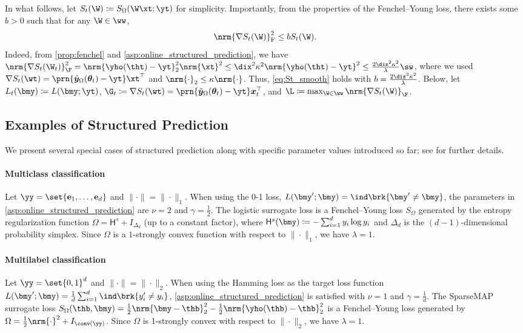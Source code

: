 In what follows, let $S_t(\W)\coloneqq S_\Omega(\W\xt;\yt)$ for simplicity.
Importantly, from the properties of the Fenchel--Young loss, there exists some $b>0$ such that for any $\W\in\ww$,  
\begin{equation}\label{eq:St_smooth}
    \nrm{\nabla S_t (\W)}_{\mathrm{F}}^2\leq b S_t(\W).
\end{equation}
Indeed, from \cref{prop:fenchel} and \cref{asp:online_structured_prediction}, we have 
$
\nrm{\nabla S_t(\W_t)}_\F^2
=
\nrm{\yho(\tht)-\yt}_2^2 \nrm{\xt}^2
\leq
\dix^2\kappa^2\nrm{\yho(\tht)-\yt}^2
\leq
\frac{2\dix^2\kappa^2}{\lambda}\sw
$, 
where we used $\nabla S_t(\wt) =  \prn{\hat{\bm{y}}_\Omega(\bm{\theta}_t) - \yt}\xt^\top$ and $\nrm{\cdot}_2 \leq \kappa \nrm{\cdot}$. 
Thus, \eqref{eq:St_smooth} holds with  $b=\frac{2\dix^2\kappa^2}{\lambda}$.
Below, let $L_t(\bmy)\coloneqq L(\bmy;\yt)$,
$\G_t\coloneqq\nabla S_t(\wt) =  \prn{\hat{\bm{y}}_\Omega(\bm{\theta}_t) - \yt} \bm{x}_t^\top$, and $\L\coloneqq\max_{\W\in\ww}\nrm{\nabla S_t(\W)}_\F$.


\subsection{Examples of Structured Prediction}\label{subsec:pre_examples} 
We present several special cases of structured prediction  
along with specific parameter values introduced so far; see \citet[Section 2.3]{pmlr-v247-sakaue24a} for further details.
\paragraph{Multiclass classification}
Let $\yy=\set{\mathbf{e}_1,\dots,\mathbf{e}_d}$ and $\|\cdot\| = \|\cdot\|_1$.
When using the 0-1 loss, $L(\bmy^{\prime};\bmy)=\ind\brk{\bmy^{\prime}\neq\bmy}$, the parameters in \cref{asp:online_structured_prediction} are $\nu=2$ and $\gamma=\frac{1}{2}$.
The logistic surrogate loss is a Fenchel--Young loss $S_\Omega$ generated by the entropy regularization function $\Omega=\mathsf{H}^s+I_{\Delta_d}$ (up to a constant factor), where $\mathsf{H}^s(\bmy)\coloneqq-\sum_{i=1}^d y_i\log y_i$ and $\Delta_d$ is the $(d-1)$-dimensional probability simplex.
Since $\Omega$ is a $1$-strongly convex function with respect to $\|\cdot\|_1$, we have $\lambda=1$.

\paragraph{Multilabel classification}
Let $\yy=\set{0,1}^d$ and $\|\cdot\| = \|\cdot\|_2$.
When using the Hamming loss as the target loss function $L(\bmy^{\prime};\bmy)=\frac{1}{d}\sum_{i=1}^{d}\ind\brk{y_{i}^{\prime}\neq y_i}$, \cref{asp:online_structured_prediction} is satisfied with $\nu=1$ and $\gamma=\frac{1}{d}$.
The SparseMAP surrogate loss $S_\Omega(\thb,\bmy)=\frac{1}{2}\nrm{\bmy-\thb}_2^2-\frac{1}{2}\nrm{\yho(\thb)-\thb}_2^2$ is a Fenchel--Young loss generated by $\Omega=\frac{1}{2}\nrm{\cdot}^2+I_{\conv(\yy)}$.
Since $\Omega$ is 1-strongly convex with respect to $\|\cdot\|_2$, we have $\lambda=1$.

